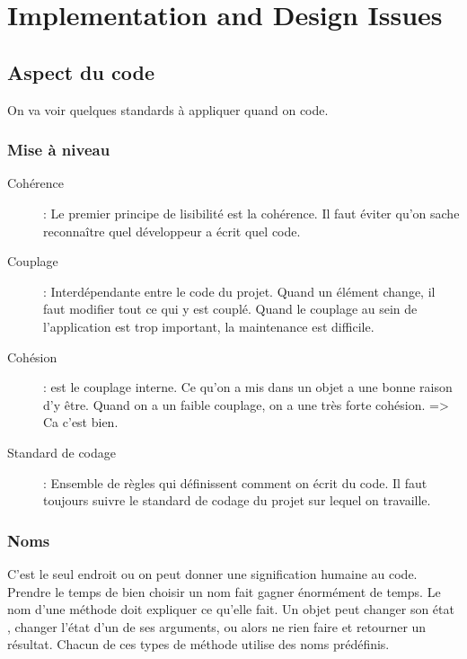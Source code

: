 \section{Implementation and Design Issues}

\subsection{Aspect du code}
On va voir quelques standards à appliquer quand on code.

\subsubsection{Mise à niveau}
\begin{description}
	\item[Cohérence]: Le premier principe de lisibilité est la cohérence. Il faut éviter qu’on sache reconnaître quel développeur a écrit quel code.
	\item[Couplage]: Interdépendante entre le code du projet. Quand un élément change, il faut modifier tout ce qui y est couplé. Quand le couplage au sein de l’application est trop important, la maintenance est difficile.

	\item[Cohésion]: est le couplage interne. Ce qu’on a mis dans un objet a une bonne raison d’y être. Quand on a un faible couplage, on a une très forte cohésion. => Ca c’est bien.

	\item[Standard de codage]: Ensemble de règles qui définissent comment on écrit du code. Il faut toujours suivre le standard de codage du projet sur lequel on travaille.
\end{description}

\subsubsection{Noms}
C’est le seul endroit ou on peut donner une signification humaine au code. Prendre le temps de bien choisir un nom fait gagner énormément de temps.
Le nom d’une méthode doit expliquer ce qu’elle fait. Un objet peut changer son état , changer l’état d’un de ses arguments, ou alors ne rien faire et retourner un résultat. Chacun de ces types de méthode utilise des noms prédéfinis. 

